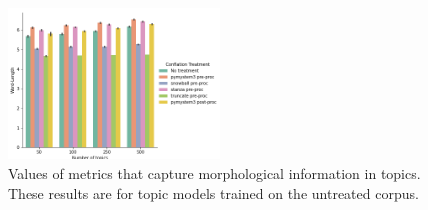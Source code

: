 \documentclass[11pt,a4paper]{article}
\begin{document}
\begin{figure}[!th]
    \includegraphics[width=0.5\textwidth]{word-length.png}
    \caption{Values of metrics that capture morphological information in topics. These results are for topic models trained on the untreated corpus.}
    \label{fig:slot_lemma_figs}
\end{figure}


\begin{landscape}
\thispagestyle{empty}
\onecolumn

\end{landscape}
\end{document}

